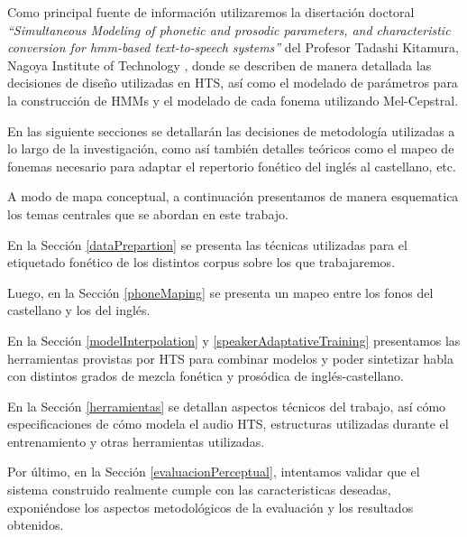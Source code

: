Como principal fuente de información utilizaremos la disertación doctoral \textit{``Simultaneous Modeling of phonetic and prosodic parameters, and characteristic conversion for hmm-based text-to-speech systems''} del Profesor Tadashi Kitamura, Nagoya Institute of Technology \cite{phoneticAndProsodic}, donde se describen de manera detallada las decisiones de diseño utilizadas en HTS, así como el modelado de parámetros para la construcción de HMMs y el modelado de cada fonema utilizando Mel-Cepstral.


En las siguiente secciones se detallarán las decisiones de metodología utilizadas a lo largo de la investigación, como así también detalles teóricos como el mapeo de fonemas necesario para adaptar el repertorio fonético del inglés al castellano, etc.

A modo de mapa conceptual, a continuación presentamos de manera esquematica los temas centrales que se abordan en este trabajo.
 
En la Sección \ref{dataPrepartion} se presenta las técnicas utilizadas para el etiquetado fonético de los distintos corpus sobre los que trabajaremos. 

Luego, en la Sección \ref{phoneMaping} se presenta un mapeo entre los fonos del castellano y los del inglés.

En la Sección \ref{modelInterpolation} y \ref{speakerAdaptativeTraining} presentamos las herramientas provistas por HTS para combinar modelos y poder sintetizar habla con distintos grados de mezcla fonética y prosódica de inglés-castellano.

En la Sección \ref{herramientas} se detallan aspectos técnicos del trabajo, así cómo especificaciones de cómo modela el audio HTS, estructuras utilizadas durante el entrenamiento y otras herramientas utilizadas. 

Por último, en la Sección \ref{evaluacionPerceptual}, intentamos validar que el sistema construido realmente cumple con las caracteristicas deseadas, exponiéndose los aspectos metodológicos de la evaluación y los resultados obtenidos.
